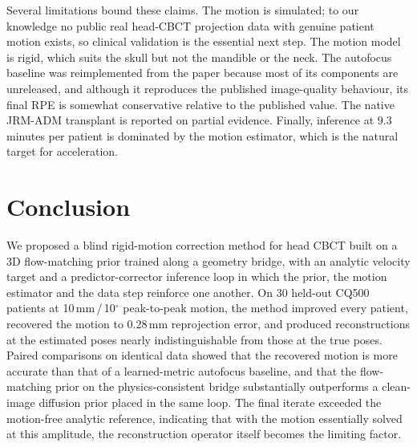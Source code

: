 \documentclass[11pt]{article}
\begin{document}
Several limitations bound these claims. The motion is simulated; to our knowledge no public
real head-CBCT projection data with genuine patient motion exists, so clinical validation is
the essential next step. The motion model is rigid, which suits the skull but not the
mandible or the neck. The autofocus baseline was reimplemented from the paper because most of
its components are unreleased, and although it reproduces the published image-quality
behaviour, its final RPE is somewhat conservative relative to the published value. The native
JRM-ADM transplant is reported on partial evidence. Finally, inference at 9.3 minutes per
patient is dominated by the motion estimator, which is the natural target for acceleration.

\section{Conclusion}
\label{sec:conclusion}

We proposed a blind rigid-motion correction method for head CBCT built on a 3D flow-matching
prior trained along a geometry bridge, with an analytic velocity target and a
predictor-corrector inference loop in which the prior, the motion estimator and the data step
reinforce one another. On 30 held-out CQ500 patients at 10\,mm\,/\,10$^\circ$ peak-to-peak
motion, the method improved every patient, recovered the motion to 0.28\,mm reprojection
error, and produced reconstructions at the estimated poses nearly indistinguishable from
those at the true poses. Paired comparisons on identical data showed that the recovered
motion is more accurate than that of a learned-metric autofocus baseline, and that the
flow-matching prior on the physics-consistent bridge substantially outperforms a
clean-image diffusion prior placed in the same loop. The final iterate exceeded the
motion-free analytic reference, indicating that with the motion essentially solved at this
amplitude, the reconstruction operator itself becomes the limiting factor.
\end{document}
